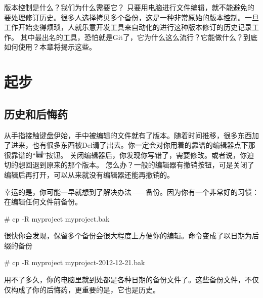 
版本控制是什么？我们为什么需要它？
只要用电脑进行文件编辑，就不能避免的要处理修订历史。很多人选择拷贝多个备份，这是一种非常原始的版本控制。一旦工作开始变得烦琐，人就乐意开发工具来自动化的进行这种版本修订的历史记录工作。
其中最出名的工具，恐怕就是Git了，它为什么这么流行？它能做什么？到底如何使用？本章将揭示这些。


\section{起步}
\subsection{历史和后悔药}

从手指接触键盘伊始，手中被编辑的文件就有了版本。随着时间推移，很多东西加了进来，也有很多东西被Del请了出去。你一定会对你用着的靠谱的编辑器点下那很靠谱的“\includegraphics[width=1em]{pics/document-save.png}”按钮。 %
关闭编辑器后，你发现你写错了，需要修改。或者说，你迫切的想回退到原来的那个版本。
怎么办？一般的编辑器有撤销按钮，可是关闭了编辑后再打开，可以从来就没有编辑器还能再撤销的。

幸运的是，你可能一早就想到了解决办法——备份。因为你有一个非常好的习惯：在编辑任何文件前备份。

\begin{code}
\# cp -R myproject myproject.bak
\end{code}

很快你会发现，保留多个备份会很大程度上方便你的编辑。命令变成了以日期为后缀的备份

\begin{code}
\# cp -R myproject myproject-2012-12-21.bak
\end{code}

用不了多久，你的电脑里就到处都是各种日期的备份文件了。这些备份文件，不仅仅构成了你的后悔药，更重要的是，它也是历史。

